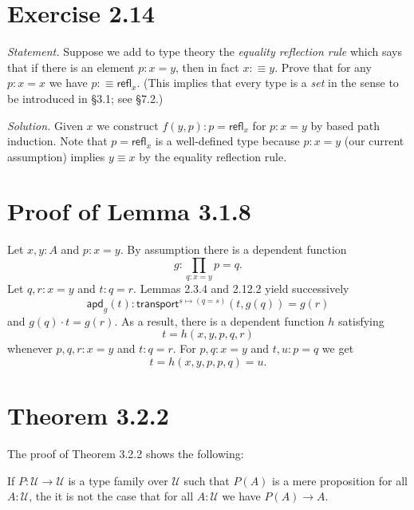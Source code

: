 \documentclass[12pt]{article}
\newcommand{\msf}{\mathsf}
\newcommand{\nn}{\noindent}
\newcommand{\refl}{\mathsf{refl}}
\newcommand{\U}{\mathcal U}
\begin{document}

\section{Exercise 2.14}

\emph{Statement.} Suppose we add to type theory the \emph{equality reflection rule} which says that if there is an element $p:x=y$, then in fact $x:\equiv y$. Prove that for any $p:x=x$ we have $p:\equiv\refl_x$. (This implies that every type is a \emph{set} in the sense to be introduced in \S3.1; see \S7.2.)

\nn\emph{Solution.} Given $x$ we construct $f(y,p):p=\refl_x$ for $p:x=y$ by based path induction. Note that $p=\refl_x$ is a well-defined type because $p:x=y$ (our current assumption) implies $y\equiv x$ by the equality reflection rule.


\section{Proof of Lemma 3.1.8}

Let $x,y:A$ and $p:x=y$. By assumption there is a dependent function 
$$
g:\prod_{q:x=y}p=q.
$$ 
Let $q,r:x=y$ and $t:q=r$. Lemmas 2.3.4 and 2.12.2 yield successively 
$$
\msf{apd}_g(t):\msf{transport}^{s\mapsto(q=s)}(t,g(q))=g(r) 
$$
and $g(q)\cdot t=g(r)$. As a result, there is a dependent function $h$ satisfying $$t=h(x,y,p,q,r)$$ whenever $p,q,r:x=y$ and $t:q=r$. For $p,q:x=y$ and $t,u:p=q$ we get 
$$
t=h(x,y,p,p,q)=u.
$$


\section{Theorem 3.2.2}

The proof of Theorem 3.2.2 shows the following:

If $P:\U\to\U$ is a type family over $\U$ such that $P(A)$ is a mere proposition for all $A:\U$, the it is not the case that for all $A:\U$ we have $P(A)\to A$.


\end{document}
